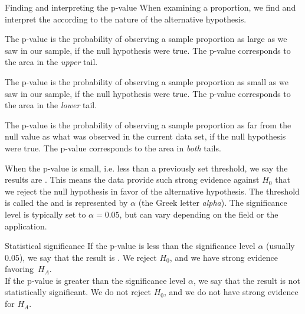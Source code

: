 \textA{\newpage}

\begin{onebox}{Finding and interpreting the p-value}
When examining a proportion, we find and interpret the  according to the nature of the alternative hypothesis.\vspace{-1mm}
\begin{description}
\setlength{\itemsep}{0mm}
\item[$H_A$: $p > p_0.$ ] The p-value is the probability of observing a sample proportion as large as we saw in our sample, if the null hypothesis were true. The p-value corresponds to the area in the \emph{upper} tail.
\item[$H_A$: $p < p_0.$ ]The p-value is the probability of observing a sample proportion as small as we saw in our sample, if the null hypothesis were true. The p-value corresponds to the area in the \emph{lower} tail.
\item[$H_A$: $p \ne p_0.$] The p-value is the probability of observing a sample proportion as far from the null value as what was observed in the current data set, if the null hypothesis were true. The p-value corresponds to the area in \emph{both} tails.
\end{description}\end{onebox}

When the p-value is small, i.e. less than a previously set threshold, we say the results are . This means the data provide such strong evidence against $H_0$ that we reject the null hypothesis in favor of the alternative hypothesis. The threshold is called the  and is represented by $\alpha$ (the Greek letter \emph{alpha}\label{alphadiscussion}).  The significance level is typically set to $\alpha = 0.05$, but can vary depending on the field or the application. %

\begin{onebox}{Statistical significance}
If the p-value is less than the significance level $\alpha$ (usually 0.05), we say that the result is . We reject $H_0$, and we have strong evidence favoring~$H_A$. \\[2mm]
If the p-value is greater than the significance level $\alpha$, we say that the result is not statistically significant. We do not reject $H_0$, and we do not have strong evidence for $H_A$.\end{onebox}

